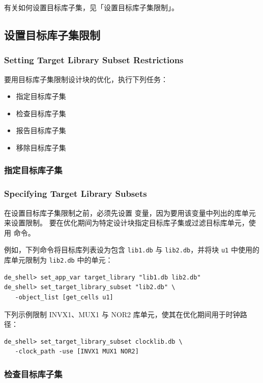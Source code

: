 有关如何设置目标库子集，见「设置目标库子集限制」。

\subsection{设置目标库子集限制}
\subsubsection*{Setting Target Library Subset Restrictions}

要用目标库子集限制设计块的优化，执行下列任务：
\begin{itemize}
  \item 指定目标库子集
  \item 检查目标库子集
  \item 报告目标库子集
  \item 移除目标库子集
\end{itemize}

\subsubsection{指定目标库子集}
\subsubsection*{Specifying Target Library Subsets}

在设置目标库子集限制之前，必须先设置  变量，因为要用该变量中列出的库单元来设置限制。
要在优化期间为特定设计块指定目标库子集或过滤目标库单元，使用  命令。

例如，下列命令将目标库列表设为包含 \texttt{lib1.db} 与 \texttt{lib2.db}，并将块 \texttt{u1} 中使用的库单元限制为 \texttt{lib2.db} 中的单元：
\begin{lstlisting}
de_shell> set_app_var target_library "lib1.db lib2.db"
de_shell> set_target_library_subset "lib2.db" \
   -object_list [get_cells u1]
\end{lstlisting}

下列示例限制 INVX1、MUX1 与 NOR2 库单元，使其在优化期间用于时钟路径：
\begin{lstlisting}
de_shell> set_target_library_subset clocklib.db \
   -clock_path -use [INVX1 MUX1 NOR2]
\end{lstlisting}

\subsubsection{检查目标库子集}
